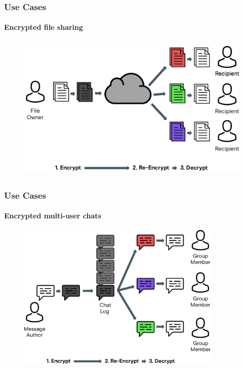\documentclass[xetex,mathsans,sans,aspectratio=169]{beamer}
\begin{document}
    \begin{frame}
        \frametitle{Use Cases}
        \framesubtitle{Encrypted file sharing}
        \begin{figure}
            \centering
            \includegraphics[height=7cm]{pdf/file-sharing-alternative.pdf}
        \end{figure}
    \end{frame}

    \begin{frame}
        \frametitle{Use Cases}
        \framesubtitle{Encrypted multi-user chats}
        \begin{figure}
            \centering
            \includegraphics[height=7cm]{pdf/chats-alternative.pdf}
        \end{figure}
    \end{frame}
\end{document}
